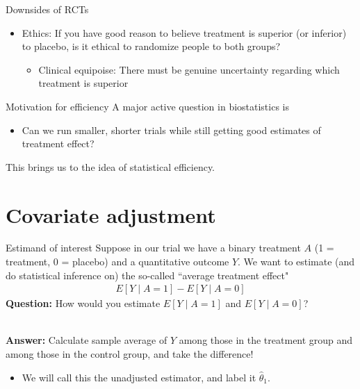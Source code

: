 \documentclass[10pt,t]{beamer}
\begin{document}
\begin{frame}{Downsides of RCTs}
	\begin{itemize}
		\item Ethics: If you have good reason to believe treatment is superior (or inferior) to placebo, is it ethical to randomize people to both groups?
		\begin{itemize}
			\item Clinical equipoise: There must be genuine uncertainty regarding which treatment is superior
		\end{itemize}
	\end{itemize}
\end{frame}

\begin{frame}{Motivation for efficiency}
	A major active question in biostatistics is
	\begin{itemize}
		\item Can we run smaller, shorter trials while still getting good estimates of treatment effect?
	\end{itemize}
	This brings us to the idea of statistical efficiency. 
\end{frame}

\section{Covariate adjustment}

\begin{frame}{Estimand of interest}
	Suppose in our trial we have a binary treatment $A$ (1 = treatment, 0 = placebo) and a quantitative outcome $Y$. We want to estimate (and do statistical inference on) the so-called ``average treatment effect" 
	\begin{align*}
		E[Y \mid A = 1] - E[Y \mid A = 0]
	\end{align*}
	\textbf{Question:} How would you estimate $E[Y \mid A = 1]$ and $E[Y \mid A = 0]$?\pause 
	\\ ~\ 
	
	\textbf{Answer:} Calculate sample average of $Y$ among those in the treatment group and among those in the control group, and take the difference!
	\begin{itemize}
		\item We will call this the unadjusted estimator, and label it $\hat{\theta}_1$. 
	\end{itemize}
\end{frame}
\end{document}
